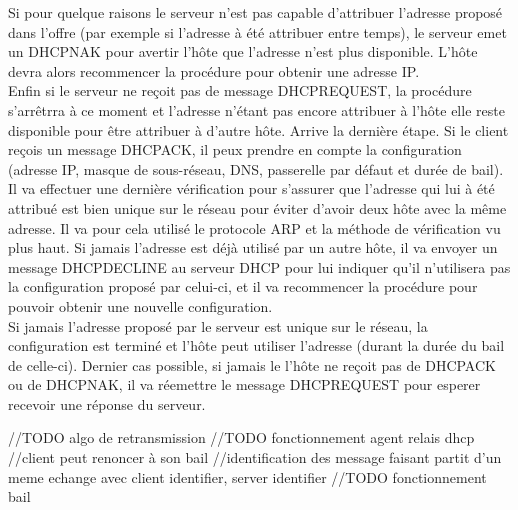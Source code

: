\documentclass[twoside,openright,a4paper,11pt,french]{article}
\begin{document}
Si pour quelque raisons le serveur n'est pas capable d'attribuer l'adresse proposé dans l'offre (par exemple si l'adresse à été attribuer entre temps), le serveur emet un DHCPNAK pour avertir l'hôte que l'adresse n'est plus disponible. L'hôte devra alors recommencer la procédure pour obtenir une adresse IP.
\\Enfin si le serveur ne reçoit pas de message DHCPREQUEST, la procédure s'arrêtrra à ce moment et l'adresse n'étant pas encore attribuer à l'hôte elle reste disponible pour être attribuer à d'autre hôte.
Arrive la dernière étape. Si le client reçois un message DHCPACK, il peux prendre en compte la configuration (adresse IP, masque de sous-réseau, DNS, passerelle par défaut et durée de bail). Il va effectuer une dernière vérification pour s'assurer que l'adresse qui lui à été attribué est bien unique sur le réseau pour éviter d'avoir deux hôte avec la même adresse. Il va pour cela utilisé le protocole ARP et la méthode de vérification vu plus haut. Si jamais l'adresse est déjà utilisé par un autre hôte, il va envoyer un message DHCPDECLINE au serveur DHCP pour lui indiquer qu'il n'utilisera pas la configuration proposé par celui-ci, et il va recommencer la procédure pour pouvoir obtenir une nouvelle configuration.
\\Si jamais l'adresse proposé par le serveur est unique sur le réseau, la configuration est terminé et l'hôte peut utiliser l'adresse (durant la durée du bail de celle-ci).
Dernier cas possible, si jamais le l'hôte ne reçoit pas de DHCPACK ou de DHCPNAK, il va réemettre le message DHCPREQUEST pour esperer recevoir une réponse du serveur.

//TODO algo de retransmission
//TODO fonctionnement agent relais dhcp
//client peut renoncer à son bail
//identification des message faisant partit d'un meme echange avec client identifier, server identifier
//TODO fonctionnement bail
\end{document}
